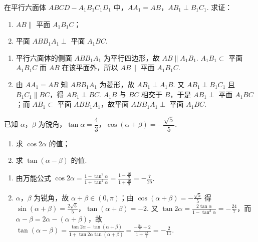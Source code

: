 \begin{problem}
在平行六面体 \(ABCD-A_1B_1C_1D_1\) 中，\(AA_1=AB\)，\(AB_1\perp B_1C_1\). 求证：

\begin{enumerate}
\item \(AB\parallel\) 平面 \(A_1B_1C\)；
\item 平面 \(ABB_1A_1\perp\) 平面 \(A_1BC\).
\end{enumerate}

\begin{center}
\end{center}
\end{problem}

\begin{solution}
\begin{enumerate}
\item 平行六面体的侧面 \(ABB_1A_1\) 为平行四边形，故 \(AB\parallel A_1B_1\). \(A_1B_1\subset\) 平面 \(A_1B_1C\) 而 \(AB\) 在该平面外，所以 \(AB\parallel\) 平面 \(A_1B_1C\).
\item 由 \(AA_1=AB\) 知 \(ABB_1A_1\) 为菱形，故 \(AB_1\perp A_1B\). 又 \(AB_1\perp B_1C_1\) 且 \(B_1C_1\parallel BC\)，得 \(AB_1\perp BC\). \(A_1B\) 与 \(BC\) 相交于 \(B\)，于是 \(AB_1\perp\) 平面 \(A_1BC\)；而 \(AB_1\subset\) 平面 \(ABB_1A_1\)，故平面 \(ABB_1A_1\perp\) 平面 \(A_1BC\).
\end{enumerate}
\end{solution}

\begin{problem}
已知 \(\alpha\)，\(\beta\) 为锐角，\(\tan\alpha=\dfrac{4}{3}\)，\(\cos(\alpha+\beta)=-\dfrac{\sqrt5}{5}\).

\begin{enumerate}
\item 求 \(\cos 2\alpha\) 的值；
\item 求 \(\tan(\alpha-\beta)\) 的值.
\end{enumerate}
\end{problem}

\begin{solution}
\begin{enumerate}
\item 由万能公式 \(\cos2\alpha=\frac{1-\tan^2\alpha}{1+\tan^2\alpha}=\frac{1-\frac{16}{9}}{1+\frac{16}{9}}=-\frac7{25}\).
\item \(\alpha\)，\(\beta\) 为锐角，故 \(\alpha+\beta\in(0,\pi)\)；由 \(\cos(\alpha+\beta)=-\frac{\sqrt5}{5}\) 得 \(\sin(\alpha+\beta)=\frac{2\sqrt5}{5}\)，\(\tan(\alpha+\beta)=-2\). 又 \(\tan2\alpha=\frac{2\tan\alpha}{1-\tan^2\alpha}=-\frac{24}{7}\)，而 \(\alpha-\beta=2\alpha-(\alpha+\beta)\)，故 \(\tan(\alpha-\beta)=\frac{\tan2\alpha-\tan(\alpha+\beta)}{1+\tan2\alpha\tan(\alpha+\beta)}=\frac{-\frac{24}{7}+2}{1+\frac{48}{7}}=-\frac2{11}\).
\end{enumerate}
\end{solution}

